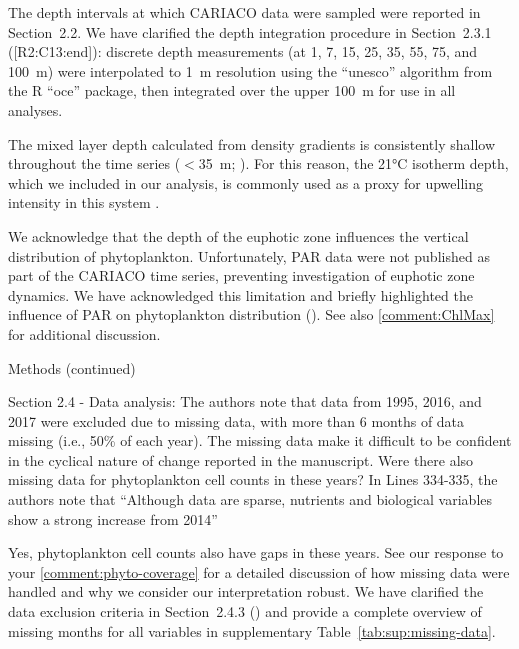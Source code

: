 \documentclass[12pt,english]{reviewresponse}
\begin{document}
\begin{revresponse}
	The depth intervals at which CARIACO data were sampled were reported in Section~2.2. We have clarified the depth integration procedure in Section~2.3.1 ([R2:C13:end]): discrete depth measurements (at 1, 7, 15, 25, 35, 55, 75, and 100~m) were interpolated to 1~m resolution using the ``unesco'' algorithm from the R ``oce'' package, then integrated over the upper 100~m for use in all analyses.
	
	The mixed layer depth calculated from density gradients is consistently shallow throughout the time series ($<$35~m; \cite{muller-karger_scientific_2019}). For this reason, the 21°C isotherm depth, which we included in our analysis, is commonly used as a proxy for upwelling intensity in this system \cite{astor_seasonal_2003, lorenzoni_bio-optical_2011, pinckney_phytoplankton_2015}.
	
	We acknowledge that the depth of the euphotic zone influences the vertical distribution of phytoplankton. Unfortunately, PAR data were not published as part of the CARIACO time series, preventing investigation of euphotic zone dynamics. We have acknowledged this limitation and briefly highlighted the influence of PAR on phytoplankton distribution (). See also \autoref{comment:ChlMax} for additional discussion.
\end{revresponse}



\begin{revcomment}
	Methods (continued)

    Section 2.4 - Data analysis:
    The authors note that data from 1995, 2016, and 2017 were excluded due to missing data, with more than 6 months of data missing (i.e., 50\% of each year). The missing data make it difficult to be confident in the cyclical nature of change reported in the manuscript. Were there also missing data for phytoplankton cell counts in these years? In Lines 334-335, the authors note that “Although data are sparse, nutrients and biological variables show a strong increase from 2014”
\end{revcomment}

\begin{revresponse}
    Yes, phytoplankton cell counts also have gaps in these years. See our response to your \autoref{comment:phyto-coverage} for a detailed discussion of how missing data were handled and why we consider our interpretation robust. We have clarified the data exclusion criteria in Section~2.4.3 () and provide a complete overview of missing months for all variables in supplementary Table~\ref{tab:sup:missing-data}.
\end{revresponse}
\end{document}
